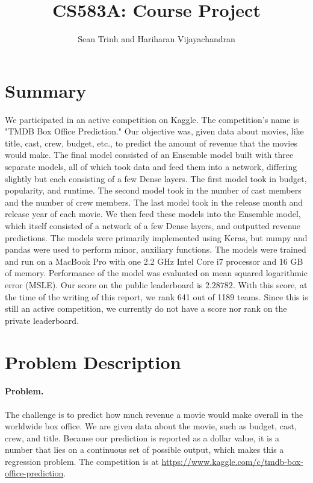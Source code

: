\documentclass[11pt]{article}
\numberwithin{equation}{section}
\begin{document}
\title{CS583A: Course Project}

\author{Sean Trinh and Hariharan Vijayachandran}


\maketitle




\section{Summary}

We participated in an active competition on Kaggle. The competition's name is "TMDB Box Office Prediction." Our objective was, given data about movies, like title, cast, crew, budget, etc., to predict the amount of revenue that the movies would make. The final model consisted of an Ensemble model built with three separate models, all of which took data and feed them into a network, differing slightly but each consisting of a few Dense layers. The first model took in budget, popularity, and runtime. The second model took in the number of cast members and the number of crew members. The last model took in the release month and release year of each movie. We then feed these models into the Ensemble model, which itself consisted of a network of a few Dense layers, and outputted revenue predictions. The models were primarily implemented using Keras, but numpy and pandas were used to perform minor, auxiliary functions. The models were trained and run on a MacBook Pro with one 2.2 GHz Intel Core i7 processor and 16 GB of memory. Performance of the model was evaluated on mean squared logarithmic error (MSLE). Our score on the public leaderboard is $2.28782$. With this score, at the time of the writing of this report, we rank 641 out of 1189 teams. Since this is still an active competition, we currently do not have a score nor rank on the private leaderboard.

\section{Problem Description}

\paragraph{Problem.}
The challenge is to predict how much revenue a movie would make overall in the worldwide box office. We are given data about the movie, such as budget, cast, crew, and title. Because our prediction is reported as a dollar value, it is a number that lies on a continuous set of possible output, which makes this a regression problem. The competition is at \url{https://www.kaggle.com/c/tmdb-box-office-prediction}. 
\end{document}
